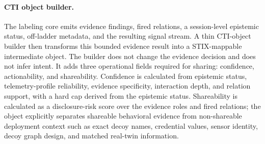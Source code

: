 \paragraph{CTI object builder.}
The labeling core emits evidence findings, fired relations, a session-level epistemic status, off-ladder metadata, and the resulting signal stream. A thin CTI-object builder then transforms this bounded evidence result into a STIX-mappable intermediate object. The builder does not change the evidence decision and does not infer intent. It adds three operational fields required for sharing: confidence, actionability, and shareability. Confidence is calculated from epistemic status, telemetry-profile reliability, evidence specificity, interaction depth, and relation support, with a hard cap derived from the epistemic status. Shareability is calculated as a disclosure-risk score over the evidence roles and fired relations; the object explicitly separates shareable behavioral evidence from non-shareable deployment context such as exact decoy names, credential values, sensor identity, decoy graph design, and matched real-twin information.
